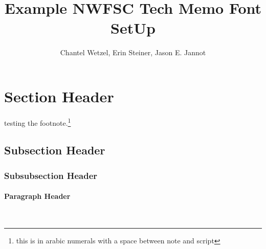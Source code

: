 \documentclass[12pt]{article}
\title{\textcolor[cmyk]{1.00,0.83,0.41,0.36}{Example NWFSC Tech Memo Font SetUp}}
\author{Chantel Wetzel, Erin Steiner, Jason E. Jannot}
\newcommand{\paragraphnewline}[1]{\paragraph{#1}\mbox{}\\}
\begin{document}
\maketitle
\normalfont %
\normalsize %

	
\section{Section Header}
\lipsum[1]
testing the footnote.\footnote{this is in arabic numerals with a space between note and script}
\subsection{Subsection Header}
\lipsum[2]
\subsubsection{Subsubsection Header}
\lipsum[3]
\paragraphnewline{Paragraph Header}
\lipsum[4]
\end{document}
